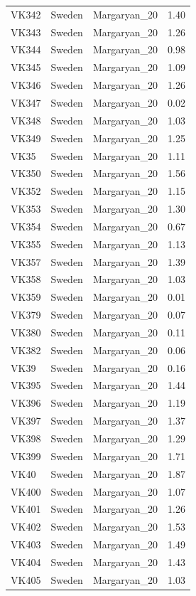 \begin{longtable}[t]{lllr}
VK342 & Sweden & Margaryan\_20 & 1.40\\
VK343 & Sweden & Margaryan\_20 & 1.26\\
VK344 & Sweden & Margaryan\_20 & 0.98\\
VK345 & Sweden & Margaryan\_20 & 1.09\\
VK346 & Sweden & Margaryan\_20 & 1.26\\
VK347 & Sweden & Margaryan\_20 & 0.02\\
VK348 & Sweden & Margaryan\_20 & 1.03\\
VK349 & Sweden & Margaryan\_20 & 1.25\\
VK35 & Sweden & Margaryan\_20 & 1.11\\
VK350 & Sweden & Margaryan\_20 & 1.56\\
VK352 & Sweden & Margaryan\_20 & 1.15\\
VK353 & Sweden & Margaryan\_20 & 1.30\\
VK354 & Sweden & Margaryan\_20 & 0.67\\
VK355 & Sweden & Margaryan\_20 & 1.13\\
VK357 & Sweden & Margaryan\_20 & 1.39\\
VK358 & Sweden & Margaryan\_20 & 1.03\\
VK359 & Sweden & Margaryan\_20 & 0.01\\
VK379 & Sweden & Margaryan\_20 & 0.07\\
VK380 & Sweden & Margaryan\_20 & 0.11\\
VK382 & Sweden & Margaryan\_20 & 0.06\\
VK39 & Sweden & Margaryan\_20 & 0.16\\
VK395 & Sweden & Margaryan\_20 & 1.44\\
VK396 & Sweden & Margaryan\_20 & 1.19\\
VK397 & Sweden & Margaryan\_20 & 1.37\\
VK398 & Sweden & Margaryan\_20 & 1.29\\
VK399 & Sweden & Margaryan\_20 & 1.71\\
VK40 & Sweden & Margaryan\_20 & 1.87\\
VK400 & Sweden & Margaryan\_20 & 1.07\\
VK401 & Sweden & Margaryan\_20 & 1.26\\
VK402 & Sweden & Margaryan\_20 & 1.53\\
VK403 & Sweden & Margaryan\_20 & 1.49\\
VK404 & Sweden & Margaryan\_20 & 1.43\\
VK405 & Sweden & Margaryan\_20 & 1.03\\

\end{longtable}
